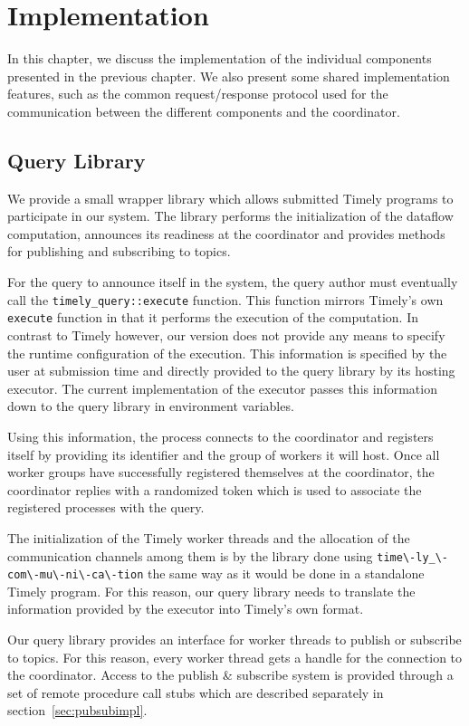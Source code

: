 \chapter{Implementation}\label{ch:impl}

In this chapter, we discuss the implementation of the individual components
presented in the previous chapter. We also present some shared implementation
features, such as the common request/response protocol used for the
communication between the different components and the coordinator.

\section{Query Library}

We provide a small wrapper library which allows submitted Timely programs to participate
in our system. The library performs the initialization of the dataflow computation,
announces its readiness at the coordinator and provides methods for
publishing and subscribing to topics.

For the query to announce itself in the system, the query author must eventually
call the \lstinline{timely_query::execute} function. This function
mirrors Timely's own \lstinline{execute} function in that it performs the execution
of the computation. In contrast to Timely however, our version does not provide
any means to specify the runtime configuration of the execution. This information
is specified by the user at submission time and directly provided to the query library
by its hosting executor. The current implementation of the executor passes
this information down to the query library in environment variables. 

Using this information, the process connects to the coordinator and registers
itself by providing its identifier and the group of workers it will host. Once
all worker groups have successfully registered themselves at the coordinator,
the coordinator replies with a randomized token which is used to associate
the registered processes with the query.

The initialization of the Timely worker threads and the allocation of the
communication channels among them is by the library done using
\lstinline{time\-ly_\-com\-mu\-ni\-ca\-tion} the same way as it would be done
in a standalone Timely program. For this reason, our query library needs to
translate the information provided by the executor into Timely's own format.


Our query library provides an interface for worker threads to
publish or subscribe to topics. For this reason, every worker thread gets
a handle for the connection to the coordinator. Access to the
publish \& subscribe system is provided through a set of remote
procedure call stubs which are described separately in section~\ref{sec:pubsubimpl}.


